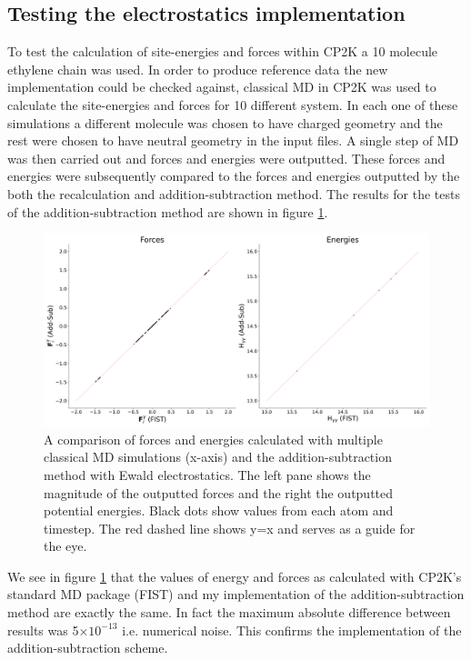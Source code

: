 \subsection{Testing the electrostatics implementation}
\label{sect:testESimp}
To test the calculation of site-energies and forces within CP2K a 10 molecule ethylene chain was used. In order to produce reference data the new implementation could be checked against, classical MD in CP2K was used to calculate the site-energies and forces for 10 different system. In each one of these simulations a different molecule was chosen to have charged geometry and the rest were chosen to have neutral geometry in the input files. A single step of MD was then carried out and forces and energies were outputted. These forces and energies were subsequently compared to the forces and energies outputted by the both the recalculation and addition-subtraction method. The results for the tests of the addition-subtraction method are shown in figure \ref{fig:AddSubEwaldTest}.
\begin{figure}[ht]
  \includegraphics[width=\textwidth]{./img/ES/10_mol_FIST.png}
  \caption{\label{fig:AddSubEwaldTest}A comparison of forces and energies calculated with multiple classical MD simulations (x-axis) and the addition-subtraction method with Ewald electrostatics. The left pane shows the magnitude of the outputted forces and the right the outputted potential energies. Black dots show values from each atom and timestep. The red dashed line shows y=x and serves as a guide for the eye.}
\end{figure}
We see in figure \ref{fig:AddSubEwaldTest} that the values of energy and forces as calculated with CP2K's standard MD package (FIST) and my implementation of the addition-subtraction method are exactly the same. In fact the maximum absolute difference between results was 5$\times 10^{-13}$ i.e. numerical noise. This confirms the implementation of the addition-subtraction scheme. 
